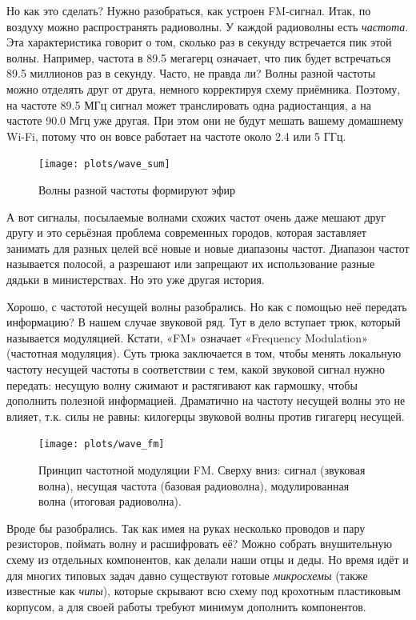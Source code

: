 Но как это сделать? Нужно разобраться, как устроен FM-сигнал. Итак, по воздуху можно распространять радиоволны. У каждой радиоволны есть \emph{частота}. Эта характеристика говорит о том, сколько раз в секунду встречается пик этой волны. Например, частота в 89.5 мегагерц означает, что пик будет встречаться 89.5 миллионов раз в секунду. Часто, не правда
ли? Волны разной частоты можно отделять друг от друга, немного корректируя схему приёмника. Поэтому, на частоте 89.5 МГц сигнал может транслировать одна радиостанция, а на частоте 90.0 Мгц уже другая. При этом они не будут мешать вашему домашнему Wi-Fi, потому что он вовсе работает на частоте около 2.4 или 5 ГГц.

\begin{figure}
  \centering
  \texttt{[image: plots/wave\_sum]}
  \caption{Волны разной частоты формируют эфир}
\end{figure}

\begin{Note}
  А вот сигналы, посылаемые волнами схожих частот очень даже мешают друг другу и это серьёзная проблема современных городов, которая заставляет занимать для разных целей всё новые и новые диапазоны частот. Диапазон частот называется полосой, а разрешают или запрещают их использование разные дядьки в министерствах. Но это уже другая история.
\end{Note}

Хорошо, с частотой несущей волны разобрались. Но как с помощью неё передать информацию? В нашем случае звуковой ряд. Тут в дело вступает трюк, который называется модуляцией. Кстати, «FM» означает «Frequency Modulation» (частотная модуляция). Суть трюка заключается в том, чтобы менять локальную частоту несущей частоты в соответствии с тем, какой звуковой сигнал нужно передать: несущую волну сжимают и растягивают как гармошку, чтобы дополнить полезной информацией. Драматично на частоту несущей волны это не влияет, т.к. силы не равны: килогерцы звуковой волны против гигагерц несущей.

\begin{figure}
  \centering
  \texttt{[image: plots/wave\_fm]}
  \caption{Принцип частотной модуляции FM. Сверху вниз: сигнал (звуковая волна), несущая частота (базовая радиоволна), модулированная волна (итоговая радиоволна).}
\end{figure}

Вроде бы разобрались. Так как имея на руках несколько проводов и пару резисторов, поймать волну и расшифровать её? Можно собрать внушительную схему из отдельных компонентов, как делали наши отцы и деды. Но время идёт и для многих типовых задач давно существуют готовые \emph{микросхемы} (также известные как \emph{чипы}), которые скрывают всю схему под крохотным пластиковым корпусом, а для своей работы требуют минимум дополнить компонентов.

